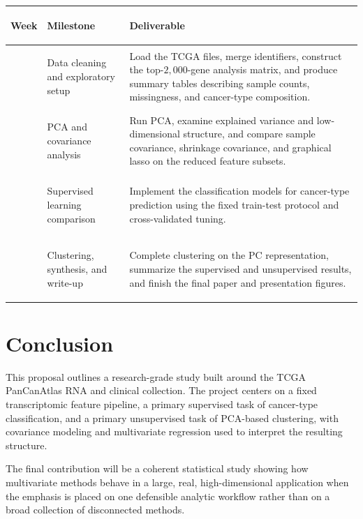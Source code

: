\documentclass[12pt]{article}
\newcommand{\1}{\mathbf{1}}
\begin{document}
\begin{center}
\renewcommand{\arraystretch}{1.25}
\begin{tabularx}{\textwidth}{>{\bfseries\raggedright\arraybackslash}p{1.2cm} >{\bfseries\raggedright\arraybackslash}p{4.1cm} >{\raggedright\arraybackslash}X}
\toprule
Week & Milestone & Deliverable \\
\midrule
1 & Data cleaning and exploratory setup &
Load the TCGA files, merge identifiers, construct the top-\(2{,}000\)-gene analysis matrix, and produce summary tables describing sample counts, missingness, and cancer-type composition. \\

2 & PCA and covariance analysis &
Run PCA, examine explained variance and low-dimensional structure, and compare sample covariance, shrinkage covariance, and graphical lasso on the reduced feature subsets. \\

3 & Supervised learning comparison &
Implement the classification models for cancer-type prediction using the fixed train-test protocol and cross-validated tuning. \\

4 & Clustering, synthesis, and write-up &
Complete clustering on the PC representation, summarize the supervised and unsupervised results, and finish the final paper and presentation figures. \\
\bottomrule
\end{tabularx}
\end{center}

\section{Conclusion}

This proposal outlines a research-grade study built around the TCGA PanCanAtlas RNA and clinical collection. The project centers on a fixed transcriptomic feature pipeline, a primary supervised task of cancer-type classification, and a primary unsupervised task of PCA-based clustering, with covariance modeling and multivariate regression used to interpret the resulting structure.

The final contribution will be a coherent statistical study showing how multivariate methods behave in a large, real, high-dimensional application when the emphasis is placed on one defensible analytic workflow rather than on a broad collection of disconnected methods.
\end{document}
